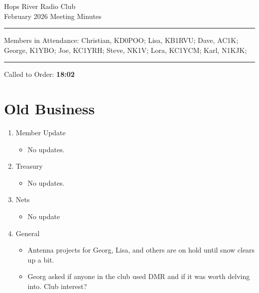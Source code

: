 \documentclass[12pt, letterpaper]{article}
\begin{document}
\begin{center}
	\huge{Hops River Radio Club}\\[10pt]
	\large{February 2026 Meeting Minutes}
\end{center}
\rule{\textwidth}{0.5pt}
	\noindent Members in Attendance: Christian, KD0POO; Lisa, KB1RVU; Dave, AC1K; George, K1YBO; Joe, KC1YRH; Steve, NK1V; Lora, KC1YCM; Karl, N1KJK; 

\rule{\textwidth}{0.5pt}

Called to Order: \textbf{18:02}

\section{Old Business}
    \begin{enumerate}
    \item Member Update
        \begin{itemize}
            \item  No updates.
        \end{itemize}
    \item Treasury
        \begin{itemize}
            \item No updates.
        \end{itemize}
    \item Nets
        \begin{itemize}
            \item No update
        \end{itemize}
    \item General
        \begin{itemize}
            \item Antenna projects for Georg, Lisa, and others are on hold until snow clears up a bit.
            \item Georg asked if anyone in the club used DMR and if it was worth delving into. Club interest?
        \end{itemize}
    \end{enumerate}
\end{document}
